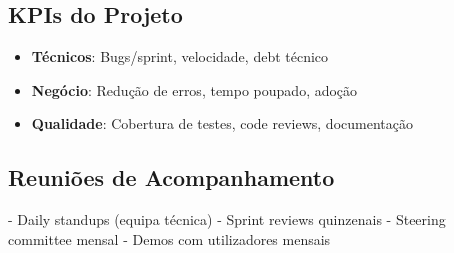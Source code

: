 \subsection{KPIs do Projeto}

\begin{itemize}
    \item \textbf{Técnicos}: Bugs/sprint, velocidade, debt técnico
    \item \textbf{Negócio}: Redução de erros, tempo poupado, adoção
    \item \textbf{Qualidade}: Cobertura de testes, code reviews, documentação
\end{itemize}

\subsection{Reuniões de Acompanhamento}

- Daily standups (equipa técnica)
- Sprint reviews quinzenais
- Steering committee mensal
- Demos com utilizadores mensais

